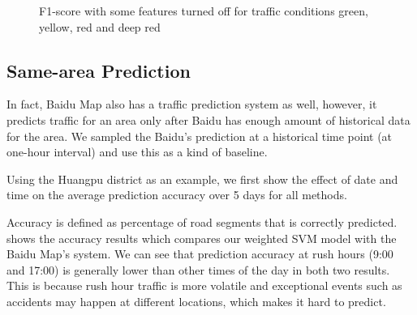 \begin{figure}[th]
\begin{subfigure}[t]{0.495\columnwidth}
\end{subfigure}
\hfill
\begin{subfigure}[t]{0.495\columnwidth}
\end{subfigure}

\caption{F1-score with some features turned off for
traffic conditions green, yellow, red and deep red}
\label{fig:4colorF1}
\end{figure}


\subsection{Same-area Prediction}

In fact, Baidu Map also has a traffic prediction system as well, however, it predicts traffic for an area only
after Baidu has enough amount of historical data for the area. We sampled the Baidu's prediction at a historical time point (at one-hour interval) and use this as a kind of baseline.

Using the Huangpu district as an example, we first show the 
effect of date and time on the average prediction accuracy over 
5 days for all methods. 

Accuracy is defined as percentage of road segments that is correctly predicted. 
 shows the accuracy results which compares our 
weighted SVM model with the Baidu Map's system. We can see that prediction accuracy at rush hours (9:00 and 17:00) is 
generally lower than other times of the day in both two results. This is because rush hour traffic is more volatile and 
exceptional events such as accidents may happen at different locations, 
which makes it hard to predict.

